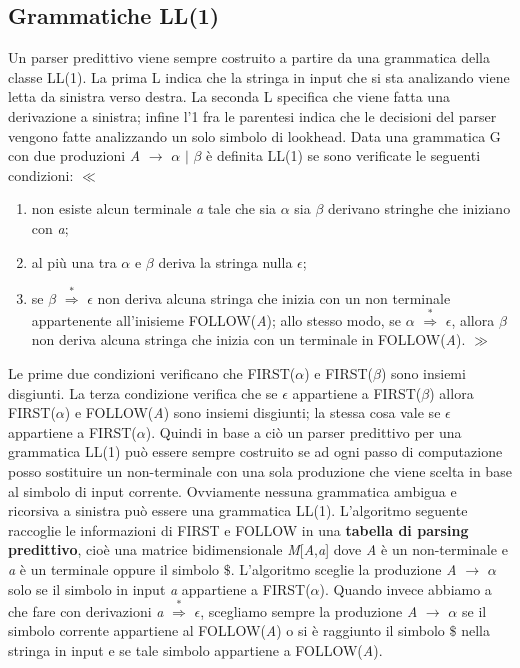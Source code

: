\subsection{Grammatiche LL(1)}
Un parser predittivo viene sempre costruito a partire da una grammatica della classe LL(1). La prima L \cite{libro: compilatori} indica che la stringa in input che si sta analizando viene letta da sinistra verso destra. La seconda L specifica che viene fatta una derivazione a sinistra; infine l'1 fra le parentesi indica che le decisioni del parser vengono fatte analizzando un solo simbolo di lookhead. Data una grammatica G con due produzioni \textit{A} $\to$ $\alpha$ $\mid$ $\beta$ è definita LL(1) se sono verificate le seguenti condizioni: $\ll$
\begin{enumerate}
	\item non esiste alcun terminale \textit{a} tale che sia $\alpha$ sia $\beta$ derivano stringhe che iniziano con \textit{a};
	\item al più una tra $\alpha$ e $\beta$ deriva la stringa nulla $\epsilon$;
	\item se $\beta$ $\overset{*}{\Rightarrow}$ $\epsilon$ non deriva alcuna stringa che inizia con un non terminale appartenente all'inisieme FOLLOW(\textit{A}); allo stesso modo, se $\alpha$ $\overset{*}{\Rightarrow}$ $\epsilon$, allora  $\beta$ non deriva alcuna stringa che inizia con un terminale in FOLLOW(\textit{A}). $\gg$
\end{enumerate}
Le prime due condizioni verificano che FIRST($\alpha$) e FIRST($\beta$) sono insiemi disgiunti. La terza condizione verifica che se $\epsilon$ appartiene a FIRST($\beta$) allora FIRST($\alpha$) e FOLLOW(\textit{A}) sono insiemi disgiunti; la stessa cosa vale se $\epsilon$ appartiene a FIRST($\alpha$). Quindi in base a ciò un parser predittivo per una grammatica LL(1) può essere sempre costruito se ad ogni passo di computazione posso sostituire un non-terminale con una sola produzione che viene scelta in base al simbolo di input corrente. Ovviamente nessuna grammatica ambigua e ricorsiva a sinistra può essere una grammatica LL(1). L'algoritmo seguente raccoglie le informazioni di FIRST e FOLLOW in una \textbf{tabella di parsing predittivo}, cioè una matrice bidimensionale \textit{M}[\textit{A},\textit{a}] dove \textit{A} è un non-terminale e \textit{a} è un terminale oppure il simbolo $\$$. L'algoritmo sceglie la produzione \textit{A} $\to$ $\alpha$ solo se il simbolo in input \textit{a} appartiene a FIRST($\alpha$). Quando invece abbiamo a che fare con derivazioni \textit{a} $\overset{*}{\Rightarrow}$ $\epsilon$, scegliamo sempre la produzione \textit{A} $\to$ $\alpha$ se il simbolo corrente appartiene al FOLLOW(\textit{A}) o si è raggiunto il simbolo $\$$ nella stringa in input e se tale simbolo appartiene a FOLLOW(\textit{A}).\par
